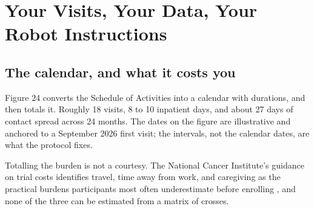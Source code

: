 \section{Your Visits, Your Data, Your Robot Instructions}

\subsection{The calendar, and what it costs you}

Figure 24 converts the Schedule of Activities into a calendar with durations,
and then totals it. Roughly 18 visits, 8 to 10 inpatient days, and about 27 days
of contact spread across 24 months. The dates on the figure are illustrative and
anchored to a September 2026 first visit; the intervals, not the calendar dates,
are what the protocol fixes.

Totalling the burden is not a courtesy. The National Cancer Institute's guidance
on trial costs identifies travel, time away from work, and caregiving as the
practical burdens participants most often underestimate before enrolling
\cite{NCICosts2024}, and none of the three can be estimated from a matrix of
crosses.

